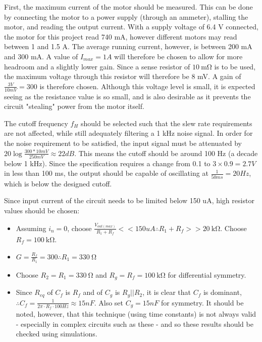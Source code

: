 First, the maximum current of the motor should be measured. This can be done by connecting the motor to a power supply (through an ammeter), stalling the motor, and reading the output current.
With a supply voltage of 6.4 V connected, the motor for this project read 740 mA, however different motors may read between 1 and 1.5 A. The average running current, however, is between 200 mA
and 300 mA. A value of $I_{max} = 1 A$ will therefore be chosen to allow for more headroom and a slightly lower gain.
Since a sense resistor of $\SI{10}{\milli\ohm}$ is to be used, the maximum voltage through this resistor will therefore be 8 mV. A gain of $\frac{3 V}{10 mV} = 300$ is therefore chosen.
Although this voltage level is small, it is expected seeing as the resistance value is so small, and is also desirable as it prevents the circuit "stealing" power from the motor itself.

The cutoff frequency $f_H$ should be selected such that the slew rate requirements are not affected, while still adequately filtering a 1 kHz noise signal. In order for the noise requirement
to be satisfied, the input signal must be attenuated by $20 \log{\frac{300 * 10 mV}{250 mV}} \approx 22 dB$. This means the cutoff should be around 100 Hz (a decade below 1 kHz).
Since the specification requires a change from 0.1 to $3 \times 0.9 = 2.7 V$ in less than 100 ms, the output should be capable of oscillating at $\frac{1}{50 ms} = 20 Hz$, which is below the designed cutoff.

Since input current of the circuit needs to be limited below 150 uA, high resistor values should be chosen:
\begin{itemize}
  \item Assuming $i_n = 0$, choose $\frac{V_{out(max)}}{R_1 + R_f} << 150 uA \therefore R_1 + R_f >> \SI{20}{\kilo\ohm}$. Choose $R_f = \SI{100}{\kilo\ohm}$.
  \item $G = \frac{R_f}{R_1} = 300 \therefore R_1 = \SI{330}{\ohm}$
  \item Choose $R_2 = R_1 = \SI{330}{\ohm}$ and $R_g = R_f = \SI{100}{\kilo\ohm}$ for differential symmetry.
  \item Since $R_{eq}$ of $C_f$ is $R_f$ and of $C_g$ is $R_g || R_2$, it is clear that $C_f$ is dominant, $\therefore C_f = \frac{1}{2 \pi \cdot R_f \cdot 100 Hz} \approx 15 nF$. Also set $C_g = 15nF$ for symmetry.
        It should be noted, however, that this technique (using time constants) is not always valid - especially in complex circuits such as these - and so these results should be checked using simulations.
\end{itemize}

